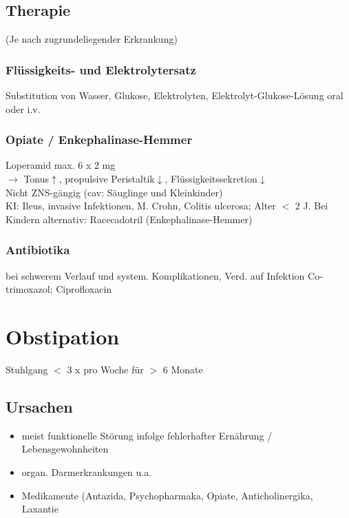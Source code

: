 \documentclass[10pt,a4paper]{report}
\begin{document}
\subsection{Therapie} %
\label{sub:therapie}
(Je nach zugrundeliegender Erkrankung)
\subsubsection{Flüssigkeits- und Elektrolytersatz} %
\label{ssub:fl_ssigkeits_und_elektrolytersatz}
Substitution von Wasser, Glukose, Elektrolyten, Elektrolyt-Glukose-Lösung oral oder i.v.
\subsubsection{Opiate / Enkephalinase-Hemmer} %
\label{ssub:opiate_enkephalinase_hemmer}
 Loperamid 	max. 6 x 2 mg\\
$\rightarrow$ Tonus$\uparrow$, propulsive Peristaltik$\downarrow$, Flüssigkeitssekretion$\downarrow$\\
Nicht ZNS-gängig (cav: Säuglinge und Kleinkinder)\\
KI: Ileus, invasive Infektionen, M. Crohn, Colitis ulcerosa; Alter $<$ 2 J.
Bei Kindern alternativ: Racecadotril (Enkephalinase-Hemmer)
\subsubsection{Antibiotika} %
\label{ssub:antibiotika}
bei schwerem Verlauf und system. Komplikationen, Verd. auf Infektion Co-trimoxazol; Ciprofloxacin
\section{Obstipation} %
\label{sec:obstipation}
Stuhlgang $<$ 3 x pro Woche für $>$ 6 Monate
\subsection{Ursachen} %
\label{sub:ursachen}
\begin{itemize}
	\item meist funktionelle Störung infolge fehlerhafter Ernährung / Lebensgewohnheiten
	\item organ. Darmerkrankungen u.a.
	\item Medikamente (Antazida, Psychopharmaka, Opiate, Anticholinergika, Laxantie
\end{itemize}
\end{document}
